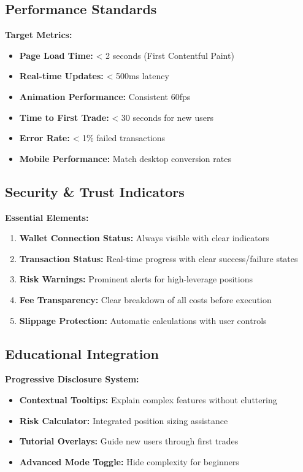 \documentclass{article}
\begin{document}
\subsection{Performance Standards}

\textbf{Target Metrics:}
\begin{itemize}[leftmargin=*]
    \item \textbf{Page Load Time:} < 2 seconds (First Contentful Paint)
    \item \textbf{Real-time Updates:} < 500ms latency
    \item \textbf{Animation Performance:} Consistent 60fps
    \item \textbf{Time to First Trade:} < 30 seconds for new users
    \item \textbf{Error Rate:} < 1\% failed transactions
    \item \textbf{Mobile Performance:} Match desktop conversion rates
\end{itemize}

\subsection{Security \& Trust Indicators}

\textbf{Essential Elements:}
\begin{enumerate}[leftmargin=*]
    \item \textbf{Wallet Connection Status:} Always visible with clear indicators
    \item \textbf{Transaction Status:} Real-time progress with clear success/failure states
    \item \textbf{Risk Warnings:} Prominent alerts for high-leverage positions
    \item \textbf{Fee Transparency:} Clear breakdown of all costs before execution
    \item \textbf{Slippage Protection:} Automatic calculations with user controls
\end{enumerate}

\subsection{Educational Integration}

\textbf{Progressive Disclosure System:}
\begin{itemize}[leftmargin=*]
    \item \textbf{Contextual Tooltips:} Explain complex features without cluttering
    \item \textbf{Risk Calculator:} Integrated position sizing assistance
    \item \textbf{Tutorial Overlays:} Guide new users through first trades
    \item \textbf{Advanced Mode Toggle:} Hide complexity for beginners
\end{itemize}
\end{document}
